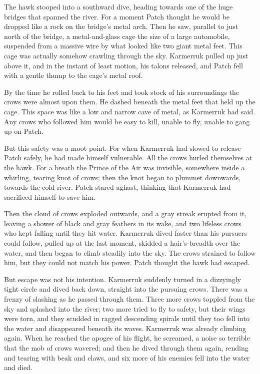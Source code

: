 \documentclass[ebook,oneside,openany,17pt]{memoir}
\newenvironment{tolerant}[1]{%
  \par\tolerance=#1\relax
}{%
  \par
}
\begin{document}
The hawk stooped into a southward dive, heading towards one of the
huge bridges that spanned the river. For a moment Patch thought he
would be dropped like a rock on the bridge’s metal arch. Then he saw,
parallel to just north of the bridge, a metal-and-glass cage the size
of a large automobile, suspended from a massive wire by what looked
like two giant metal feet. This cage was actually somehow crawling
through the sky. Karmerruk pulled up just above it, and in the instant
of least motion, his talons released, and Patch fell with a gentle
thump to the cage’s metal roof.

\begin{tolerant}{1000}
By the time he rolled back to his feet and took stock of his
surroundings the crows were almost upon them. He dashed beneath the
metal feet that held up the cage. This space was like a low and narrow
cave of metal, as Karmerruk had said. Any crows who followed him would
be easy to kill, unable to fly, unable to gang up on Patch.
\end{tolerant}

\begin{tolerant}{2000}
But this safety was a moot point. For when Karmerruk had slowed to
release Patch safely, he had made himself vulnerable. All the crows
hurled themselves at the hawk. For a breath the Prince of the Air was
invisible, somewhere inside a whirling, tearing knot of crows; then
the knot began to plummet downwards, towards the cold river. Patch
stared aghast, thinking that Karmerruk had sacrificed himself to save
him.
\end{tolerant}

\begin{tolerant}{500}
Then the cloud of crows exploded outwards, and a gray streak erupted
from it, leaving a shower of black and gray feathers in its wake, and
two lifeless crows who kept falling until they hit water. Karmerruk
dived faster than his pursuers could follow, pull\-ed up at the last
moment, skidded a hair’s-breadth over the water, and then began to
climb steadily into the sky. The crows strained to follow him, but
they could not match his power. Patch thought the hawk had escaped.
\end{tolerant}

But escape was not his intention. Karmerruk suddenly turned in a
dizzyingly tight circle and dived back down, straight into the
pursuing crows. There was a frenzy of slashing as he passed through
them. Three more crows toppled from the sky and splashed into the
river; two more tried to fly to safety, but their wings were torn, and
they scudded in ragged descending spirals until they too fell into the
water and disappeared beneath its waves. Karmerruk was already
climbing again. When he reached the apogee of his flight, he screamed,
a noise so terrible that the mob of crows wavered; and then he dived
through them again, rending and tearing with beak and claws, and six
more of his enemies fell into the water and died.
\end{document}

